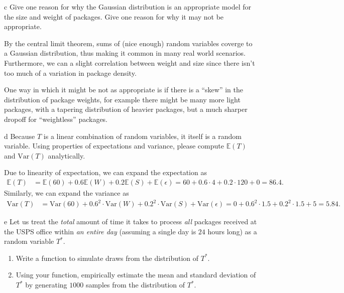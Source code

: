 \documentclass[expanded]{pset}
\begin{document}
\begin{parts}
  \begin{part}{c}
     Give one reason for why the Gaussian distribution is an appropriate model for the size and weight of packages. Give one reason for why it may not be appropriate.
  \end{part}

  By the central limit theorem, sums of (nice enough) random variables coverge to a Gaussian distribution, thus making it common in many real world scenarios. Furthermore, we can a slight correlation between weight and size since there isn't too much of a variation in package density.

  One way in which it might be not as appropriate is if there is a ``skew'' in the distribution of package weights, for example there might be many more light packages, with a tapering distribution of heavier packages, but a much sharper dropoff for ``weightless'' packages.

  \begin{part}{d}
    Because $T$ is a linear combination of random variables, it itself is a random variable. Using properties of expectations and variance, please compute $\mathbb{E}(T)$ and $\mathrm{Var}(T)$ analytically.
  \end{part}

  Due to linearity of expectation, we can expand the expectation as
  \[
    \begin{aligned}
      \mathbb{E}(T) &= \mathbb{E}(60)+0.6\mathbb{E}(W) + 0.2\mathbb{E}(S)+\mathbb{E}(\epsilon) = 60+0.6\cdot 4 + 0.2\cdot 120 + 0 = 86.4.
    \end{aligned}
  \]
  Similarly, we can expand the variance as 
  \[
    \begin{aligned}
      \mathrm{Var}(T) &= \mathrm{Var}(60)+0.6^2\cdot \mathrm{Var}(W) + 0.2^2\cdot \mathrm{Var}(S)+\mathrm{Var}(\epsilon) = 0 + 0.6^2\cdot 1.5 + 0.2^2\cdot 1.5 + 5 = 5.84.
    \end{aligned}
  \]

  \begin{part}{e}
     Let us treat the \textit{total} amount of time it takes to process \textit{all} packages received at the USPS office within \textit{an entire day} (assuming a single day is $24$ hours long) as a random variable $T^{*}$. 
    \begin{enumerate}
        \item Write a function to simulate draws from the distribution of $T^{*}$. 
        \item Using your function, empirically estimate the mean and standard deviation of $T^{*}$ by generating $1000$ samples from the distribution of $T^{*}$.
    \end{enumerate}
  \end{part}


\end{parts}
\end{document}
